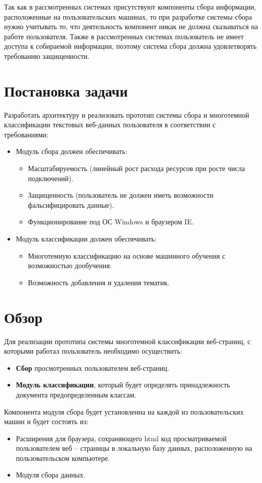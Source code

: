 \documentclass[russian, utf8, emptystyle]{eskdtext}
\begin{document}
Так как в рассмотренных системах присутствуют компоненты сбора информации, расположенные на пользовательских машинах, то при разработке системы сбора нужно учитывать то, что деятельность компонент никак не должна сказываться на работе пользователя. Также в рассмотренных системах пользователь не имеет доступа к собираемой информации, поэтому система сбора должна удовлетворять требованию защищенности.
\section{Постановка задачи}
Разработать архитектуру и реализовать прототип системы сбора и многотемной классификации текстовых веб-данных пользователя в соответствии  с требованиями:
\begin{itemize}
	\item Модуль сбора должен обеспечивать:
	\begin{itemize}
		\item Масштабируемость (линейный рост расхода ресурсов при росте числа подключений).
		\item Защищенность (пользователь не должен иметь возможности фальсифицировать данные).
		\item Функционирование под ОС Windows и браузером IE. 
	\end{itemize}
	\item Модуль классификации должен обеспечивать:
		\begin{itemize}
			\item Многотемную классификацию на основе машинного обучения с возможностью дообучения.
			\item Возможность добавления и удаления тематик.
		\end{itemize}
\end{itemize}
\section{Обзор}
Для реализации прототипа системы многотемной классификации веб-страниц, с которыми работал пользователь необходимо осуществить:
\begin{itemize}
	\item {\bf Сбор} просмотренных пользователем веб-страниц.
	\item {\bf Модуль классификации}, который будет определять принадлежность документа предопределенным классам.
\end{itemize}

Компонента модуля сбора будет установленна на каждой из пользовательских машин и будет состоять из:
\begin{itemize}
	\item Расширения для браузера, сохраняющего html код просматриваемой пользователем веб – страницы в локальную базу данных, расположенную на пользовательском компьютере.
	\item Модуля сбора данных.
\end{itemize}
\end{document}
